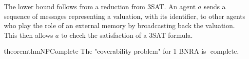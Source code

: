 %
%
%

The \NP lower bound follows from a reduction from 3SAT. An agent $a$ sends a sequence of messages representing a valuation, with its identifier, to other agents who play the role of an external memory by broadcasting back the valuation. This then allows $a$ to check the satisfaction of a 3SAT formula.
%


\begin{restatable}{theorem}{thmNPComplete}
	\label{thm:np-complete-query-cover}
	The "coverability problem" for 1-BNRA is \NP-complete. 
\end{restatable}

